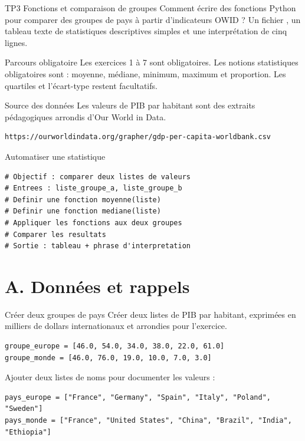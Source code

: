 \documentclass[11pt,a4paper]{article}
\begin{document}
\workbooktitle
  {TP3}
  {Fonctions et comparaison de groupes}
  {Comment écrire des fonctions Python pour comparer des groupes de pays à partir d'indicateurs OWID ?}
  {Un fichier , un tableau texte de statistiques descriptives simples et une interprétation de cinq lignes.}

\begin{checkpointbox}{Parcours obligatoire}
Les exercices 1 à 7 sont obligatoires. Les notions statistiques obligatoires sont : moyenne, médiane, minimum, maximum et proportion. Les quartiles et l'écart-type restent facultatifs.
\end{checkpointbox}

\begin{checkpointbox}{Source des données}
Les valeurs de PIB par habitant sont des extraits pédagogiques arrondis d'Our World in Data.
\begin{lstlisting}[language=terminal]
https://ourworldindata.org/grapher/gdp-per-capita-worldbank.csv
\end{lstlisting}
\end{checkpointbox}

\begin{pseudocodeexercise}{Automatiser une statistique}
\begin{lstlisting}
# Objectif : comparer deux listes de valeurs
# Entrees : liste_groupe_a, liste_groupe_b
# Definir une fonction moyenne(liste)
# Definir une fonction mediane(liste)
# Appliquer les fonctions aux deux groupes
# Comparer les resultats
# Sortie : tableau + phrase d'interpretation
\end{lstlisting}
\end{pseudocodeexercise}

\section*{A. Données et rappels}

\begin{mandatoryexercise}{Créer deux groupes de pays}
Créer deux listes de PIB par habitant, exprimées en milliers de dollars internationaux et arrondies pour l'exercice.
\begin{lstlisting}
groupe_europe = [46.0, 54.0, 34.0, 38.0, 22.0, 61.0]
groupe_monde = [46.0, 76.0, 19.0, 10.0, 7.0, 3.0]
\end{lstlisting}
Ajouter deux listes de noms pour documenter les valeurs :
\begin{lstlisting}
pays_europe = ["France", "Germany", "Spain", "Italy", "Poland", "Sweden"]
pays_monde = ["France", "United States", "China", "Brazil", "India", "Ethiopia"]
\end{lstlisting}
\end{mandatoryexercise}
\end{document}
